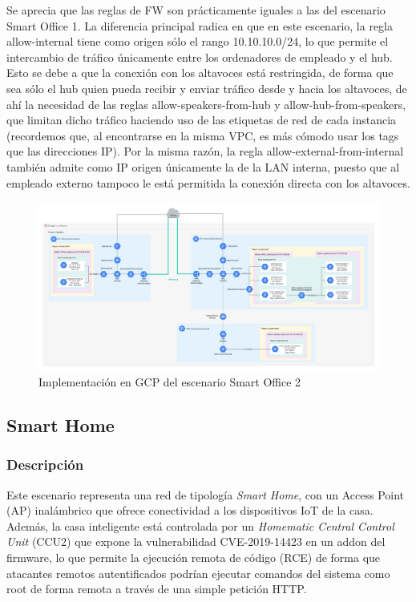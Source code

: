   Se aprecia que las reglas de FW son prácticamente iguales a las del escenario Smart Office 1. La diferencia principal radica en que en este escenario, la regla allow-internal tiene como origen sólo el rango 10.10.10.0/24, lo que permite el intercambio de tráfico únicamente entre los ordenadores de empleado y el hub. Esto se debe a que la conexión con los altavoces está restringida, de forma que sea sólo el hub quien pueda recibir y enviar tráfico desde y hacia los altavoces, de ahí la necesidad de las reglas allow-speakers-from-hub y allow-hub-from-speakers, que limitan dicho tráfico haciendo uso de las etiquetas de red de cada instancia (recordemos que, al encontrarse en la misma VPC, es más cómodo usar los tags que las direcciones IP). Por la misma razón, la regla allow-external-from-internal también admite como IP origen únicamente la de la LAN interna, puesto que al empleado externo tampoco le está permitida la conexión directa con los altavoces.

  \clearpage
  \begin{figure}[h]
  \centering
  \includegraphics[width=1.45\textwidth, angle=270]{../imgs/desarrollo/escenarios-de-red/smart-office-2/EscenarioSmartOffice2V2.png}
  \caption{Implementación en GCP del escenario Smart Office 2}
  \label{fig:so2-i}
  \end{figure}
  \clearpage

\subsection{Smart Home} \label{sec:sh}
\subsubsection{Descripción}
  Este escenario representa una red de tipología \textit{Smart Home}, con un Access Point (AP) inalámbrico que ofrece conectividad a los dispositivos IoT de la casa. Además, la casa inteligente está controlada por un \textit{Homematic Central Control Unit} (CCU2) que expone la vulnerabilidad CVE-2019-14423 en un addon del firmware, lo que permite la ejecución remota de código (RCE) de forma que atacantes remotos autentificados podrían ejecutar comandos del sistema como root de forma remota a través de una simple petición HTTP.

